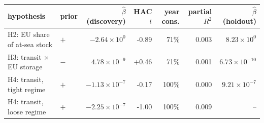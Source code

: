 \begin{tabular}{llrrrrr}
\toprule
hypothesis & prior & $\hat\beta$ (discovery) & HAC $t$ & year cons. & partial $R^2$ & $\hat\beta$ (holdout) \\
\midrule
  H2: EU share of at-sea stock & $+$ & $-2.64 \times 10^{0}$ & -0.89 & 71\% & 0.003 & $8.23 \times 10^{0}$ \\
  H3: transit $\times$ EU storage & $-$ & $4.78 \times 10^{-9}$ & +0.46 & 71\% & 0.001 & $6.73 \times 10^{-10}$ \\
  H4: transit, tight regime & $+$ & $-1.13 \times 10^{-7}$ & -0.17 & 100\% & 0.000 & $9.21 \times 10^{-7}$ \\
  H4: transit, loose regime & $+$ & $-2.25 \times 10^{-7}$ & -1.00 & 100\% & 0.009 & -- \\
\bottomrule
\end{tabular}
